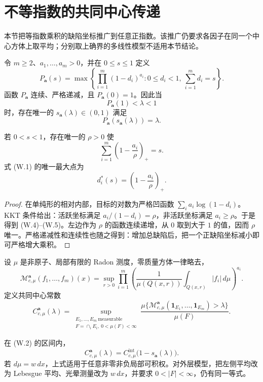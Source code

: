 \section{不等指数的共同中心传递}\label{sec:weighted-exponents}

本节把等指数乘积的缺陷坐标推广到任意正指数。该推广仍要求各因子在同一个中心方体上取平均；分别取上确界的多线性模型不适用本节结论。

令 $m\ge2$、$a_1,\ldots,a_m>0$，并在 $0\le s\le1$ 定义
\[
 P_{\boldsymbol a}(s)=
 \max\left\{\prod_{i=1}^m(1-d_i)^{a_i}:
 0\le d_i<1,\ \sum_{i=1}^m d_i=s\right\}.
 \tag{W.1}
\]
函数 $P_{\boldsymbol a}$ 连续、严格递减，且 $P_{\boldsymbol a}(0)=1$。因此当
\[
 P_{\boldsymbol a}(1)<\lambda<1
 \tag{W.2}
\]
时，存在唯一的 $s_{\boldsymbol a}(\lambda)\in(0,1)$ 满足
\[
 P_{\boldsymbol a}(s_{\boldsymbol a}(\lambda))=\lambda.
 \tag{W.3}
\]

\begin{lemma}[水位分配]\label{lem:water-filling}
若 $0<s<1$，存在唯一的 $\rho>0$ 使
\[
 \sum_{i=1}^m\left(1-\frac{a_i}{\rho}\right)_+=s.
 \tag{W.4}
\]
式 \textup{(W.1)} 的唯一最大点为
\[
 d_i^*(s)=\left(1-\frac{a_i}{\rho}\right)_+.
 \tag{W.5}
\]
\end{lemma}

\begin{proof}
在单纯形的相对内部，目标的对数为严格凹函数
\(\sum_i a_i\log(1-d_i)\)。KKT 条件给出：活跃坐标满足
\(a_i/(1-d_i)=\rho\)，非活跃坐标满足 $a_i\ge\rho$。于是得到
\textup{(W.4)}--\textup{(W.5)}。左边作为 $\rho$ 的函数连续递增，从 $0$ 取到大于 $1$ 的值，因而 $\rho$ 唯一。严格递减性和连续性也随之得到：增加总缺陷后，把一个正缺陷坐标减小即可严格增大乘积。
\end{proof}

设 $\mu$ 是非原子、局部有限的 Radon 测度，零质量方体一律略去，
\[
 \mathcal M_{c,\mu}^{\boldsymbol a}(f_1,\ldots,f_m)(x)
 =\sup_{r>0}\prod_{i=1}^m
 \left(\frac{1}{\mu(Q(x,r))}\int_{Q(x,r)}|f_i|\,d\mu\right)^{a_i}.
\]
定义共同中心常数
\[
 C_{c,\mu}^{\boldsymbol a}(\lambda)=
 \sup_{\substack{E_1,\ldots,E_m\ \mathrm{measurable}\\
 F=\cap_iE_i,\ 0<\mu(F)<\infty}}
 \frac{\mu\{\mathcal M_{c,\mu}^{\boldsymbol a}
 (\mathbf1_{E_1},\ldots,\mathbf1_{E_m})>\lambda\}}{\mu(F)}.
\]

\begin{theorem}[不等指数共同中心精确传递]\label{thm:weighted-transfer}
在 \textup{(W.2)} 的区间内，
\[
 C_{c,\mu}^{\boldsymbol a}(\lambda)=
 C_{c,\mu}^{\mathrm{int}}\bigl(1-s_{\boldsymbol a}(\lambda)\bigr).
 \tag{W.6}
\]
若 $d\mu=w\,dx$，上式适用于任意非零非负局部可积权。对外层模型，把左侧平均改为 Lebesgue 平均、光晕测量改为 $w\,dx$，并要求 $0<|F|<\infty$，仍有同一等式。
\end{theorem}

